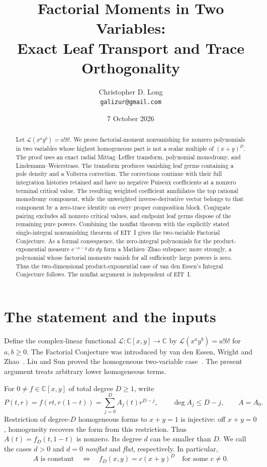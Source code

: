 \documentclass[11pt]{article}
\title{Factorial Moments in Two Variables:\\
Exact Leaf Transport and Trace Orthogonality}
\author{Christopher D. Long\\\small\texttt{galizur@gmail.com}}
\date{7 October 2026}
\numberwithin{equation}{section}
\theoremstyle{definition}\newtheorem{definition}[theorem]{Definition}
\theoremstyle{remark}\newtheorem{remark}[theorem]{Remark}
\newcommand{\C}{\mathbb C}
\newcommand{\Lfac}{\mathcal L}
\newcommand{\dd}{\,d}
\begin{document}
\maketitle
\begin{abstract}
Let $\Lfac(x^ay^b)=a!b!$. We prove factorial-moment nonvanishing for
nonzero polynomials in two variables whose highest homogeneous part is
not a scalar multiple of $(x+y)^D$. The proof uses an exact radial
Mittag--Leffler transform, polynomial monodromy, and
Lindemann--Weierstrass. The transform produces vanishing leaf germs
containing a pole density and a Volterra correction. The corrections
continue with their full integration histories retained and have no
negative Puiseux coefficients at a nonzero terminal critical value.
The resulting weighted coefficient annihilates the top rational
monodromy component, while the unweighted inverse-derivative vector
belongs to that component by a zero-trace identity on every proper
composition block. Conjugate pairing excludes all nonzero critical
values, and endpoint leaf germs dispose of the remaining pure powers.
Combining the nonflat theorem with the explicitly stated
single-integral nonvanishing theorem of EIT~I gives the two-variable
Factorial Conjecture. As a formal consequence, the zero-integral
polynomials for the product-exponential measure
$e^{-x-y}\dd x\dd y$ form a Mathieu--Zhao subspace; more strongly,
a polynomial whose factorial moments vanish for all sufficiently large
powers is zero. Thus the two-dimensional product-exponential case of
van den Essen's Integral Conjecture follows. The nonflat argument is independent of EIT~I.
\end{abstract}

\section{The statement and the inputs}\label{sec:introduction}
Define the complex-linear functional $\Lfac:\C[x,y]\to\C$ by
$\Lfac(x^ay^b)=a!b!$ for $a,b\ge0$. The Factorial Conjecture was introduced
by van den Essen, Wright and Zhao~\cite{FC}. Liu and Sun proved the
homogeneous two-variable case~\cite{LiuSun}. The present argument treats
arbitrary lower homogeneous terms.

For $0\ne f\in\C[x,y]$ of total degree $D\ge1$, write
\begin{equation}\label{eq:radial-polynomial}
 P(t,r)=f(rt,r(1-t))=\sum_{j=0}^{D}A_j(t)r^{D-j},
 \qquad \deg A_j\le D-j,\qquad A=A_0.
\end{equation}
Restriction of degree-$D$ homogeneous forms to $x+y=1$ is injective:
off $x+y=0$, homogeneity recovers the form from this restriction.
Thus $A(t)=f_D(t,1-t)$ is nonzero. Its degree $d$ can be smaller than $D$.
We call the cases $d>0$ and $d=0$ \emph{nonflat} and \emph{flat}, respectively.
In particular,
\[
 A\text{ is constant}\quad\Longleftrightarrow\quad
 f_D(x,y)=c(x+y)^D\quad\text{for some }c\ne0.
\]
\end{document}
